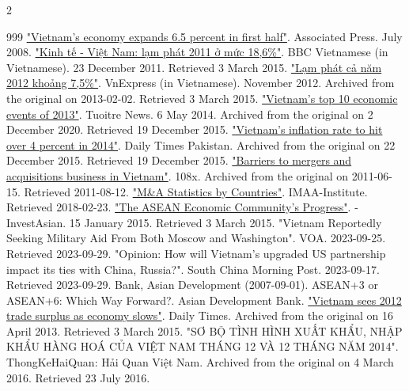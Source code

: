 \documentclass[openany]{book}
\begin{document}
\begin{multicols}{2}
\begin{thebibliography}{999}
 \href{http://www.iht.com/articles/ap/2008/07/01/business/AS-Vietnam-Economy.php}{"Vietnam's economy expands 6.5 percent in first half"}. Associated Press. July 2008.
 \href{https://www.bbc.com/vietnamese/business/2011/12/111223_viet_inflation}{"Kinh tế - Việt Nam: lạm phát 2011 ở mức 18,6\%"}. BBC Vietnamese (in Vietnamese). 23 December 2011. Retrieved 3 March 2015.
 \href{https://web.archive.org/web/20130202094412/http://vnexpress.net/gl/kinh-doanh/2012/11/lam-phat-ca-nam-2012-khoang-7-5/}{"Lạm phát cả năm 2012 khoảng 7,5\%"}. VnExpress (in Vietnamese). November 2012. Archived from the original on 2013-02-02. Retrieved 3 March 2015.
 \href{https://web.archive.org/web/20201202043929/https://tuoitrenews.vn/business/16643/vietnams-top-10-economic-events-of-2013}{"Vietnam's top 10 economic events of 2013"}. Tuoitre News. 6 May 2014. Archived from the original on 2 December 2020. Retrieved 19 December 2015.
 \href{https://web.archive.org/web/20151222085636/http://www.dailytimes.com.pk/business/25-Dec-2014/vietnam-s-inflation-rate-to-hit-over-4-percent-in-2014}{"Vietnam's inflation rate to hit over 4 percent in 2014"}. Daily Times Pakistan. Archived from the original on 22 December 2015. Retrieved 19 December 2015.
 \href{https://web.archive.org/web/20110615082931/http://108x.org/moi-truong-kinh-doanh/kinh-doanh-tai-vn/191-rao-can-mua-ban-va-sap-nhap-doanh-nghiep}{"Barriers to mergers and acquisitions business in Vietnam"}. 108x. Archived from the original on 2011-06-15. Retrieved 2011-08-12.
 \href{https://imaa-institute.org/m-and-a-statistics-countries/}{"M\&A Statistics by Countries"}. IMAA-Institute. Retrieved 2018-02-23.
 \href{http://www.investasian.com/2015/01/15/asean-economic-communitys-progress/}{"The ASEAN Economic Community's Progress"}. - InvestAsian. 15 January 2015. Retrieved 3 March 2015.
 "Vietnam Reportedly Seeking Military Aid From Both Moscow and Washington". VOA. 2023-09-25. Retrieved 2023-09-29.
 "Opinion: How will Vietnam's upgraded US partnership impact its ties with China, Russia?". South China Morning Post. 2023-09-17. Retrieved 2023-09-29.
 Bank, Asian Development (2007-09-01). ASEAN+3 or ASEAN+6: Which Way Forward?. Asian Development Bank.
 \href{http://www.dailytimes.com.pk/default.asp?page=2013%5C01%5C17%5Cstory_17-1-2013_pg5_27}{"Vietnam sees 2012 trade surplus as economy slows"}. Daily Times. Archived from the original on 16 April 2013. Retrieved 3 March 2015.
 "SƠ BỘ TÌNH HÌNH XUẤT KHẨU, NHẬP KHẨU HÀNG HOÁ CỦA VIỆT NAM THÁNG 12 VÀ 12 THÁNG NĂM 2014". ThongKeHaiQuan: Hải Quan Việt Nam. Archived from the original on 4 March 2016. Retrieved 23 July 2016.

\end{thebibliography}
\end{multicols}
\end{document}
